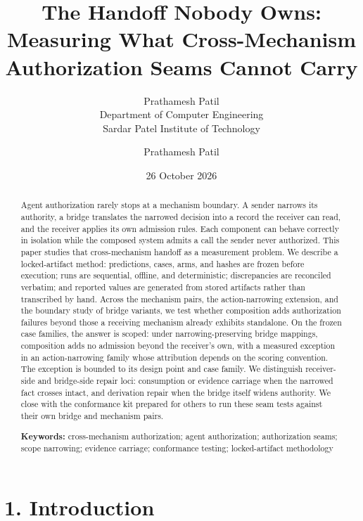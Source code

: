 \documentclass[
  10pt,
]{article}
\author{Prathamesh Patil\\Department of Computer Engineering\\Sardar Patel Institute of Technology}%
\title{The Handoff Nobody Owns: Measuring What Cross-Mechanism
Authorization Seams Cannot Carry}
\author{Prathamesh Patil}
\date{26 October 2026}
\renewcommand{\_}{\origunderscore\allowbreak}
\begin{document}
\maketitle

\begin{abstract}

Agent authorization rarely stops at a mechanism boundary. A sender
narrows its authority, a bridge translates the narrowed decision into a
record the receiver can read, and the receiver applies its own admission
rules. Each component can behave correctly in isolation while the
composed system admits a call the sender never authorized. This paper
studies that cross-mechanism handoff as a measurement problem. We
describe a locked-artifact method: predictions, cases, arms, and hashes
are frozen before execution; runs are sequential, offline, and
deterministic; discrepancies are reconciled verbatim; and reported
values are generated from stored artifacts rather than transcribed by
hand. Across the mechanism pairs, the action-narrowing extension, and
the boundary study of bridge variants, we test whether composition adds
authorization failures beyond those a receiving mechanism already
exhibits standalone. On the frozen case families, the answer is scoped:
under narrowing-preserving bridge mappings, composition adds no
admission beyond the receiver's own, with a measured exception in an
action-narrowing family whose attribution depends on the scoring
convention. The exception is bounded to its design point and case
family. We distinguish receiver-side and bridge-side repair loci:
consumption or evidence carriage when the narrowed fact crosses intact,
and derivation repair when the bridge itself widens authority. We close
with the conformance kit prepared for others to run these seam tests
against their own bridge and mechanism pairs.

\textbf{Keywords:} cross-mechanism authorization; agent authorization;
authorization seams; scope narrowing; evidence carriage; conformance
testing; locked-artifact methodology

\end{abstract}

\section{1. Introduction}\label{introduction}
\end{document}
